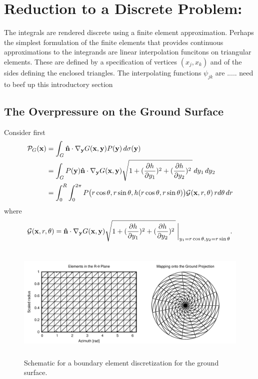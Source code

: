 

\section{Reduction to a Discrete Problem:}\label{sec:discretization}

The integrals are rendered discrete using a finite element approximation. Perhaps the simplest formulation of the finite elements that provides continuous approximations to the integrands are linear interpolation funcitons on triangular elements. These are defined by a specification of vertices $(x_j,x_k)$ and of the sides defining the enclosed triangles. The interpolating functions $\psi_{jk}$ are ..... {\color{red} need to beef up this introductory section}

\subsection{The Overpressure on the Ground Surface}\label{subsec:gnd_surface}

\vspace*{5pt}

Consider first 
\begin{align*}
{\cal P}_G({\bf x})&=\int_{G}{\bf \hat n}\cdot\nabla_{\bf y} G({\bf x},{\bf y})P({\bf y}) \, d\sigma({\bf y})\\
&=
\int_{G}
P({\bf y}){\bf \hat n}\cdot\nabla_{\bf y} G({\bf x},{\bf y})
\sqrt{1+(\frac{\partial h}{\partial y_1})^2+(\frac{\partial h}{\partial y_2})^2\,} \, dy_1\, dy_2\\
&=
\int_0^R\int_0^{2\pi} P\big(r\cos\theta,r\sin\theta,h(r\cos\theta,r\sin\theta)\big){\cal G}({\bf x},r,\theta)\, rd\theta\, dr
\end{align*}
where
\[
{\cal G}({\bf x},r,\theta)
=
{\bf \hat n}\cdot\nabla_{\bf y} G({\bf x},{\bf y})
\sqrt{1+(\frac{\partial h}{\partial y_1})^2+(\frac{\partial h}{\partial y_2})^2\,}\, \bigg|_{y_1=r\cos\theta,y_2=r\sin\theta}.
\]

\begin{figure}[h]
  \centering
  \includegraphics[height=160pt]{figures/ground_elements.pdf}
  \caption{Schematic for a boundary element discretization for the ground surface.}
  \label{fig:ground_elements}
\end{figure}

